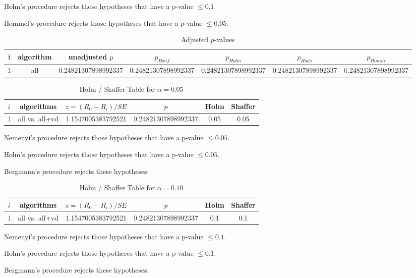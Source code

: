 \documentclass[a4paper,10pt]{article}
\begin{document}
\begin{landscape}
Holm's procedure rejects those hypotheses that have a p-value $\le0.1$.


Hommel's procedure rejects those hypotheses that have a p-value $\le0.05$.


\begin{table}[!htp]
\centering\tiny
\caption{Adjusted $p$-values}
\begin{tabular}{ccccccc}
i&algorithm&unadjusted $p$&$p_{Bonf}$&$p_{Holm}$&$p_{Hoch}$&$p_{Homm}$\\
\hline
1&all&0.24821307898992337&0.24821307898992337&0.24821307898992337&0.24821307898992337&0.24821307898992337\\
\hline
\end{tabular}
\end{table}

\begin{table}[!htp]
\centering\tiny
\caption{Holm / Shaffer Table for $\alpha=0.05$}
\begin{tabular}{cccccc}
$i$&algorithms&$z=(R_0 - R_i)/SE$&$p$&Holm&Shaffer\\
\hline
1&all vs. all+vd&1.1547005383792521&0.24821307898992337&0.05&0.05\\\hline
\end{tabular}
\end{table}
Nemenyi's procedure rejects those hypotheses that have a p-value $\le0.05$.


Holm's procedure rejects those hypotheses that have a p-value $\le0.05$.


Bergmann's procedure rejects these hypotheses:


\begin{itemize}


\end{itemize}


\begin{table}[!htp]
\centering\tiny
\caption{Holm / Shaffer Table for $\alpha=0.10$}
\begin{tabular}{cccccc}
$i$&algorithms&$z=(R_0 - R_i)/SE$&$p$&Holm&Shaffer\\
\hline
1&all vs. all+vd&1.1547005383792521&0.24821307898992337&0.1&0.1\\\hline
\end{tabular}
\end{table}
Nemenyi's procedure rejects those hypotheses that have a p-value $\le0.1$.


Holm's procedure rejects those hypotheses that have a p-value $\le0.1$.


Bergmann's procedure rejects these hypotheses:



\end{landscape}
\end{document}
